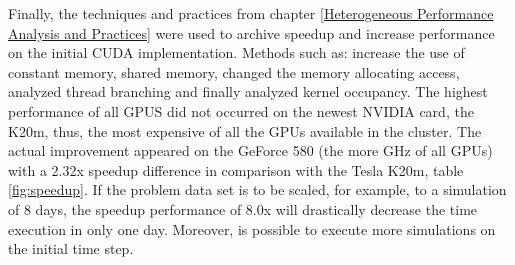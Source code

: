   \vspace{4.0em}

Finally, the techniques and practices from chapter \ref{Heterogeneous Performance Analysis and Practices} were used to archive speedup and increase performance on the initial CUDA implementation. Methods such as: increase the use of constant memory, shared memory, changed the memory allocating access, analyzed thread branching and finally analyzed kernel occupancy. The highest performance of all GPUS did not occurred on the newest NVIDIA card, the K20m, thus, the most expensive of all the GPUs available in the cluster. The actual improvement appeared on the GeForce 580 (the more GHz of all GPUs) with a 2.32x speedup difference in comparison with the Tesla K20m, table \ref{fig:speedup}. If the problem data set is to be scaled, for example, to a simulation of 8 days, the speedup performance of 8.0x will drastically decrease the time execution in only one day. Moreover, is possible to execute more simulations on the initial time step.
  
